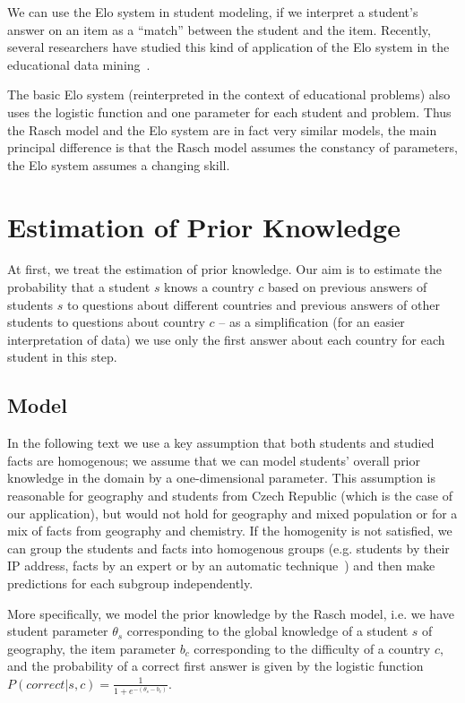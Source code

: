 \documentclass{edm_template}
\begin{document}
We can use the Elo system in student modeling, if we interpret a student's answer
on an item as a ``match'' between the student and the item. Recently, several
researchers have studied this kind of application of the Elo system in
the educational data
mining~\cite{klinkenberg2011computer,wauters2010adaptive,wauters2011monitoring}.

The basic Elo system (reinterpreted in the context of educational
problems) also uses the logistic function and one parameter for each student and
problem. Thus the Rasch model and the Elo system are in fact very similar models,
the main principal difference is that the Rasch model assumes the constancy of
parameters, the Elo system assumes a changing skill.



\section{Estimation of Prior Knowledge}

At first, we treat the estimation of prior knowledge. Our aim is to estimate
the probability that a student $s$ knows a country $c$ based on previous
answers of students $s$ to questions about different countries and previous
answers of other students to questions about country $c$ -- as a simplification
(for an easier interpretation of data) we use only the first answer about each
country for each student in this step.


\subsection{Model}

In the following text we use a key assumption that both students and studied facts
are homogenous; we assume that we can model students' overall prior knowledge in
the domain by a one-dimensional parameter. This assumption is reasonable for
geography and students from Czech Republic (which is the case of our
application), but would not hold for geography and mixed population or for a mix
of facts from geography and chemistry. If the homogenity is not satisfied, we
can group the students and facts into homogenous groups (e.g. students by their
IP address, facts by an expert or by an automatic technique~\cite{aied13}) and
then make predictions for each subgroup independently.

More specifically, we model the prior knowledge by the Rasch model, i.e. we
have student parameter $\theta_s$ corresponding to the global knowledge of a
student $s$ of geography, the item parameter $b_c$ corresponding to the difficulty
of a country $c$, and the probability of a correct first answer is given by the
logistic function $P(\mathit{correct}|s,c) = \frac{1}{1+e^{-(\theta_s -
    b_c)}}$.
\end{document}
